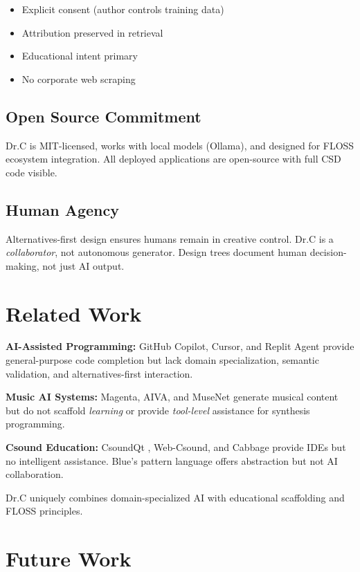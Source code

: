 \documentclass[a4paper]{article}
\begin{document}
\begin{itemize}
\item Explicit consent (author controls training data)
\item Attribution preserved in retrieval
\item Educational intent primary
\item No corporate web scraping
\end{itemize}

\subsection{Open Source Commitment}

Dr.C is MIT-licensed, works with local models (Ollama), and designed for FLOSS ecosystem integration. All deployed applications are open-source with full CSD code visible.

\subsection{Human Agency}

Alternatives-first design ensures humans remain in creative control. Dr.C is a \textit{collaborator}, not autonomous generator. Design trees document human decision-making, not just AI output.

\section{Related Work}
\label{sec:related}

\textbf{AI-Assisted Programming:} GitHub Copilot, Cursor, and Replit Agent provide general-purpose code completion but lack domain specialization, semantic validation, and alternatives-first interaction.

\textbf{Music AI Systems:} Magenta, AIVA, and MuseNet generate musical content but do not scaffold \textit{learning} or provide \textit{tool-level} assistance for synthesis programming.

\textbf{Csound Education:} CsoundQt \cite{csoundqt}, Web-Csound, and Cabbage provide IDEs but no intelligent assistance. Blue's pattern language offers abstraction but not AI collaboration.

Dr.C uniquely combines domain-specialized AI with educational scaffolding and FLOSS principles.

\section{Future Work}
\label{sec:future}
\end{document}
